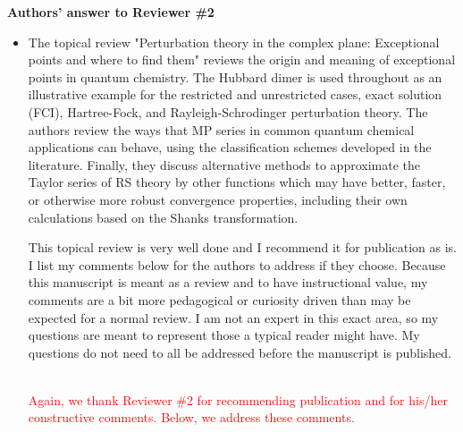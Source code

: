 \documentclass[10pt]{letter}
\newcommand{\alert}[1]{\textcolor{red}{#1}}
\begin{document}
\begin{letter}
\begin{itemize}
\end{itemize}

\noindent \textbf{\large Authors' answer to Reviewer \#2}

\begin{itemize}

	\item 
	{The topical review "Perturbation theory in the complex plane: Exceptional points and where to find them" reviews the origin and meaning of exceptional points in quantum chemistry. 
	The Hubbard dimer is used throughout as an illustrative example for the restricted and unrestricted cases, exact solution (FCI), Hartree-Fock, and Rayleigh-Schrodinger perturbation theory. 
	The authors review the ways that MP series in common quantum chemical applications can behave, using the classification schemes developed in the literature. 
	Finally, they discuss alternative methods to approximate the Taylor series of RS theory by other functions which may have better, faster, or otherwise more robust convergence properties, including their own calculations based on the Shanks transformation.

	This topical review is very well done and I recommend it for publication as is. 
	I list my comments below for the authors to address if they choose. 
	Because this manuscript is meant as a review and to have instructional value, my comments are a bit more pedagogical or curiosity driven than may be expected for a normal review. 
	I am not an expert in this exact area, so my questions are meant to represent those a typical reader might have. 
	My questions do not need to all be addressed before the manuscript is published.}
	\\
	\alert{Again, we thank Reviewer \#2 for recommending publication and for his/her constructive comments.
	Below, we address these comments.}


\end{itemize}
\end{letter}
\end{document}
